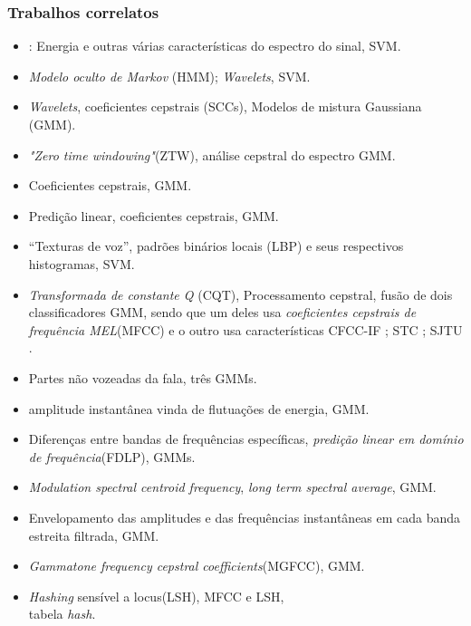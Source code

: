 \begin{frame}[allowframebreaks]
	\frametitle{Trabalhos correlatos}
	\begin{itemize}
		\item \cite{Ren2019}: Energia e outras várias características do espectro do sinal, SVM.
		\item \cite{DiqunYan2019} \textit{Modelo oculto de Markov} (HMM); \textit{Wavelets}, SVM.
		\item \cite{7802552} \textit{Wavelets}, coeficientes cepstrais (SCCs), Modelos de mistura Gaussiana (GMM).
		\item \cite{alluri2019replay} \textit{"Zero time windowing"}(ZTW), análise cepstral do espectro GMM.
		\item \cite{8725688} Coeficientes cepstrais, GMM.
		\item \cite{Hanilci2018} Predição linear, coeficientes cepstrais, GMM.
		\item \cite{ISI:000473343500086} ``Texturas de voz'', padrões binários locais (LBP) e seus respectivos histogramas, SVM.
		\item \cite{TODISCO2017516} \textit{Transformada de constante Q} (CQT), Processamento cepstral, fusão de dois classificadores GMM, sendo que um deles usa \textit{coeficientes cepstrais de frequência MEL}(MFCC) e o outro usa características CFCC-IF \cite{Patel2015}; STC \cite{7472724}; SJTU \cite{korshunov2016overview}.
		\item \cite{ISI:000490497200068} Partes não vozeadas da fala, três GMMs.
		\item \cite{ISI:000465363900136} amplitude instantânea vinda de flutuações de energia, GMM.
		\item \cite{ISI:000465363900139} Diferenças entre bandas de frequências específicas, \textit{predição linear em domínio de frequência}(FDLP), GMMs.
		\item \cite{Suthokumar2018} \textit{Modulation  spectral  centroid  frequency}, \textit{long term spectral average}, GMM.
		\item \cite{ISI:000458728700054} Envelopamento das amplitudes e das frequências instantâneas em cada banda estreita filtrada, GMM.
		\item \cite{ISI:000392503100008} \textit{Gammatone frequency cepstral coefficients}(MGFCC), GMM.
		\item \cite{8396208} \textit{Hashing} sensível a locus(LSH), MFCC e LSH, \\
		tabela \textit{hash}. 
	\end{itemize}
\end{frame}